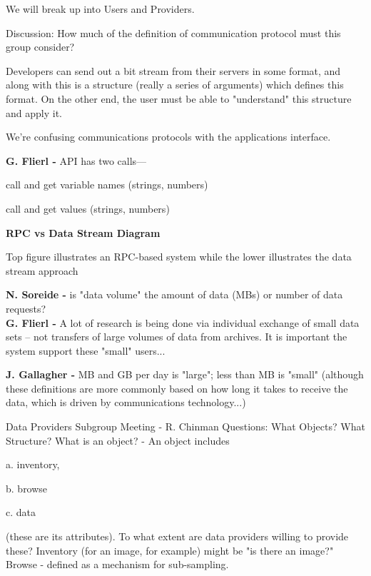 We will break up into Users and Providers.  

Discussion:  How much of the definition of communication protocol must 
this group consider?  

Developers can send out a  bit stream from their servers in some format, 
and along with this is a structure (really a series of arguments) which 
defines this format.  On the other end, the user must be able to 
"understand" this structure and apply it.

We're confusing communications protocols with the applications 
interface.  

{\bf G. Flierl -}  API has two calls---
\begin{description}
	\item{} call and get variable names (strings, numbers)
	\item{} call and get values (strings, numbers)

\begin{center}
{\bf RPC vs Data Stream Diagram}
\end{center}

	           Top figure illustrates an RPC-based system while the lower 
		illustrates the data stream approach

\smallskip
{\bf N. Soreide -} is "data volume" the amount of data (MBs) or number of data 
requests?\\
\smallskip
{\bf G. Flierl -} A lot of research is being done via individual exchange of
small data sets -- not transfers of large volumes of data from archives.  It
is important the system support these "small" users...

\smallskip
{\bf J. Gallagher -} MB and GB per day is "large"; less than MB is "small"  
(although these definitions are more commonly based on how long it takes 
to receive the data, which is driven by communications technology...)
\medskip

\noindent Data Providers Subgroup Meeting   - R. Chinman 
\smallskip
Questions:  What Objects?  What Structure?
\smallskip
What is an object? - An object includes 
\begin{description}
	\item{a.}  inventory,
	\item{b.}  browse
	\item{c.}  data  
\end{description}
		(these are its attributes).  
\smallskip
To what extent are data providers willing to provide these?  
\smallskip
Inventory (for an image, for example) might be "is there an image?"
\smallskip
Browse - defined as a mechanism for sub-sampling.


\end{description}
